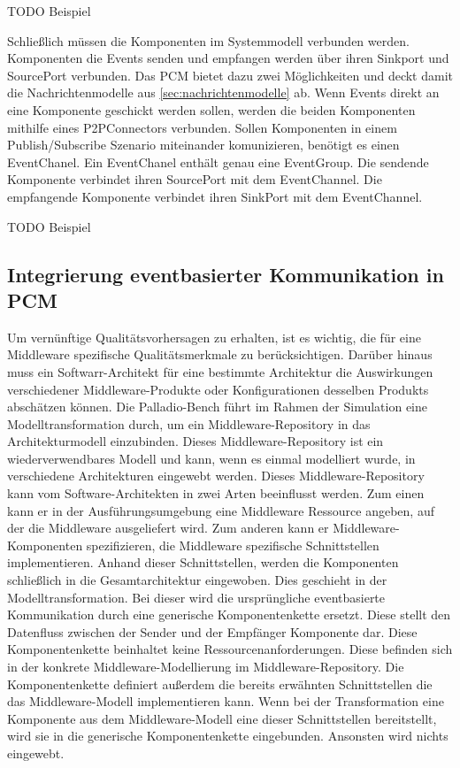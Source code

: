 TODO Beispiel

Schließlich müssen die Komponenten im Systemmodell verbunden werden. Komponenten die Events senden und empfangen werden über ihren Sinkport und SourcePort verbunden. Das PCM bietet dazu zwei Möglichkeiten und deckt damit die Nachrichtenmodelle aus \autoref{sec:nachrichtenmodelle} ab. Wenn Events direkt an eine Komponente geschickt werden sollen, werden die beiden Komponenten mithilfe eines P2PConnectors verbunden. Sollen Komponenten in einem Publish/Subscribe Szenario miteinander komunizieren, benötigt es einen EventChanel. Ein EventChanel enthält genau eine EventGroup. Die sendende Komponente verbindet ihren SourcePort mit dem EventChannel. Die empfangende Komponente verbindet ihren SinkPort mit dem EventChannel. 

TODO Beispiel



\subsection{Integrierung eventbasierter Kommunikation in PCM}
\label{sec:eventbasetransformation}
Um vernünftige Qualitätsvorhersagen zu erhalten, ist es wichtig, die für eine Middleware spezifische Qualitätsmerkmale zu berücksichtigen. Darüber hinaus muss ein Softwarr-Architekt für eine bestimmte Architektur die Auswirkungen verschiedener Middleware-Produkte oder Konfigurationen desselben Produkts abschätzen können. Die Palladio-Bench führt im Rahmen der Simulation eine Modelltransformation durch, um ein Middleware-Repository in das Architekturmodell einzubinden. Dieses Middleware-Repository ist ein wiederverwendbares Modell und kann, wenn es einmal modelliert wurde, in verschiedene Architekturen eingewebt werden. Dieses Middleware-Repository kann vom Software-Architekten in zwei Arten beeinflusst werden. Zum einen kann er in der Ausführungsumgebung eine Middleware Ressource angeben, auf der die Middleware ausgeliefert wird. Zum anderen kann er Middleware-Komponenten spezifizieren, die Middleware spezifische Schnittstellen implementieren. Anhand dieser Schnittstellen, werden die Komponenten schließlich in die Gesamtarchitektur eingewoben. Dies geschieht in der Modelltransformation. Bei dieser wird die ursprüngliche eventbasierte Kommunikation durch eine generische Komponentenkette ersetzt. Diese stellt den Datenfluss zwischen der Sender und der Empfänger Komponente dar. Diese Komponentenkette beinhaltet keine Ressourcenanforderungen. Diese befinden sich in der konkrete Middleware-Modellierung im Middleware-Repository. Die Komponentenkette definiert außerdem die bereits erwähnten Schnittstellen die das Middleware-Modell implementieren kann. Wenn bei der Transformation eine Komponente aus dem Middleware-Modell eine dieser Schnittstellen bereitstellt, wird sie in die generische Komponentenkette eingebunden. Ansonsten wird nichts eingewebt.

